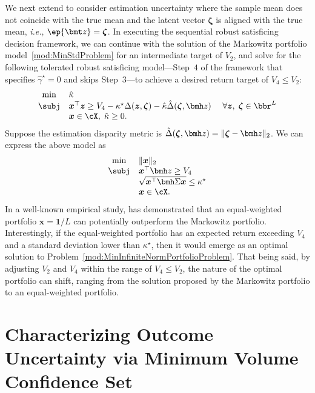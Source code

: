 \documentclass[opre, blindrev]{informs4}
\newcommand{\1}[1]{\mathds{1}{\left(#1\right)}}
\begin{document}
We next extend to consider estimation uncertainty where the sample mean does not coincide with the true mean and the latent vector $\bm \zeta$ is aligned with the true mean, \textit{i.e.}, $\ep{\bmt z} = \bm \zeta$. In executing the sequential robust satisficing decision framework, we can continue with the solution of the Markowitz portfolio model~\eqref{mod:MinStdProblem} for an intermediate target of $V_2$, and solve for the following tolerated robust satisficing model---Step~$4$ of the framework that specifies $\hat \gamma^\star = 0$ and skips Step~$3$---to achieve a desired return target of $V_4 \leq V_2$:
$$
\begin{array}{cll}
\min & \hat \kappa \\
\subj& \bm x^\top \bm z  \geq V_4 - \kappa^\star \Delta(\bm z,\bm \zeta) - \hat \kappa \hat \Delta(\bm \zeta,\bmh z) &~\forall \bm z, \; \bm \zeta \in \bbr^L \\
& \bm x \in \cX, \; \hat \kappa \geq 0.
\end{array}
$$
Suppose the estimation disparity metric is $\hat \Delta(\bm \zeta,\bmh z) = \|\bm \zeta -\bmh z \|_2$. We can express the above model as
\begin{equation}
\label{mod:MinInfiniteNormPortfolioProblem}    
\begin{array}{cll}
\min & \displaystyle  \|\bm x\|_2 \\
\subj & \bm x^\top \bmh z \geq V_4 \\
& \sqrt{\bm x^\top \bmh \Sigma \bm x} \leq \kappa^\star \\
& \bm x \in \cX.
\end{array}
\end{equation}
In a well-known empirical study, \cite{demiguel2009optimal} has demonstrated that an equal-weighted portfolio $\bm x = \bm 1/L$ can potentially outperform the Markowitz portfolio. Interestingly, if the equal-weighted portfolio has an expected return exceeding $V_4$ and a standard deviation lower than $\kappa^\star$, then it would emerge as an optimal solution to Problem~\eqref{mod:MinInfiniteNormPortfolioProblem}. That being said, by adjusting $V_2$ and $V_4$ within the range of $V_4 \leq V_2$, the nature of the optimal portfolio can shift, ranging from the solution proposed by the Markowitz portfolio to an equal-weighted portfolio. 

\section{Characterizing Outcome Uncertainty via Minimum Volume Confidence Set} \label{sec:OutcomeUncertaintyData}
\end{document}
